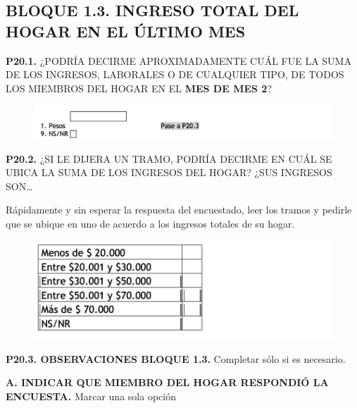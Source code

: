 \documentclass[
  openany]{book}
\begin{document}
\hypertarget{bloque-1.3.-ingreso-total-del-hogar-en-el-uxfaltimo-mes}{%
\subsection{\texorpdfstring{\textbf{BLOQUE 1.3. INGRESO TOTAL DEL HOGAR EN EL ÚLTIMO MES}}{BLOQUE 1.3. INGRESO TOTAL DEL HOGAR EN EL ÚLTIMO MES}}\label{bloque-1.3.-ingreso-total-del-hogar-en-el-uxfaltimo-mes}}

\textbf{P20.1.} ¿PODRÍA DECIRME APROXIMADAMENTE CUÁL FUE LA SUMA DE LOS INGRESOS, LABORALES O DE CUALQUIER TIPO, DE TODOS LOS MIEMBROS DEL HOGAR EN EL \textbf{MES DE MES 2}?

\begin{figure}

{\centering \includegraphics[width=1\linewidth]{imagenes/figura6-301} 

}

\end{figure}

\textbf{P20.2.} ¿SI LE DIJERA UN TRAMO, PODRÍA DECIRME EN CUÁL SE UBICA LA SUMA DE LOS INGRESOS DEL HOGAR? ¿SUS INGRESOS SON\ldots{}

Rápidamente y sin esperar la respuesta del encuestado, leer los tramos y pedirle que se ubique en uno de acuerdo a los ingresos totales de su hogar.

\begin{figure}

{\centering \includegraphics[width=1\linewidth]{imagenes/figura6-302} 

}

\end{figure}

\textbf{P20.3. OBSERVACIONES BLOQUE 1.3.} Completar sólo si es necesario.

\textbf{A. INDICAR QUE MIEMBRO DEL HOGAR RESPONDIÓ LA ENCUESTA.}
Marcar una sola opción
\end{document}

